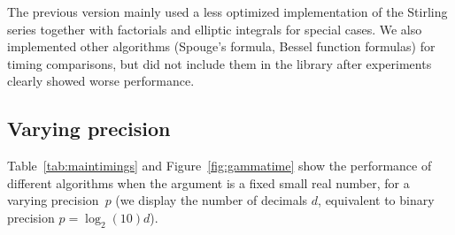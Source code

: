 \documentclass[reqno]{amsart}
\theoremstyle{definition}
\begin{document}
The previous version mainly used a less optimized
implementation of the Stirling series
together with factorials and elliptic integrals for special cases.
We also implemented other algorithms (Spouge's formula, Bessel function formulas) for
timing comparisons, but did not include them in the library
after experiments clearly showed worse performance.

\subsection{Varying precision}

Table~\ref{tab:maintimings} and Figure~\ref{fig:gammatime} show
the performance of different algorithms
when the argument is a fixed small real number,
for a varying precision~$p$ (we display the number of decimals $d$, equivalent to binary precision $p = \log_2(10) d$).
\end{document}
